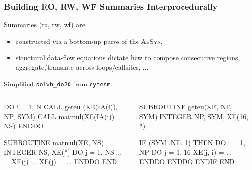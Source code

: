 \documentclass{beamer}
\newcommand{\emp}[1]{\textcolor{DikuRed}{ #1}}
\begin{document}
\begin{frame}[fragile,t]
  \frametitle{Building RO, RW, WF Summaries Interprocedurally}

Summaries ({\sc ro}, {\sc rw}, {\sc wf}) are
\begin{itemize}
    \item constructed via a bottom-up parse of the \textsc{AbSyn},
    \item structural data-flow equations dictate how to compose consecutive regions,
            aggregate/translate across loops/callsites, ...
\end{itemize}

\pause

\begin{block}{Simplified {\tt solvh\_do20} from {\tt dyfesm}} \vspace{-1ex}
\begin{columns} 
\begin{colorcode}[fontsize=\scriptsize]
\emp{DO i = 1, N}
    CALL geteu (XE(IA(i)), NP, SYM)
    CALL matmul(XE(IA(i)), NS)
\emp{ENDDO}

SUBROUTINE matmul(XE, NS)
  INTEGER NS, XE(*)
  DO j = 1, NS
    ...   = XE(j) ...
    XE(j) = ...
  ENDDO 
END
\end{colorcode}
\begin{colorcode}[fontsize=\scriptsize]
SUBROUTINE geteu(XE, NP, SYM)
  INTEGER NP, SYM, XE(16, *)
  
  IF (SYM .NE. 1) THEN
    DO i = 1, NP
      DO j = 1, 16
        XE(j, i) = ...
      ENDDO 
    ENDDO
  ENDIF
END
\end{colorcode}
\end{columns}
\end{block}

\end{frame}


\end{document}
